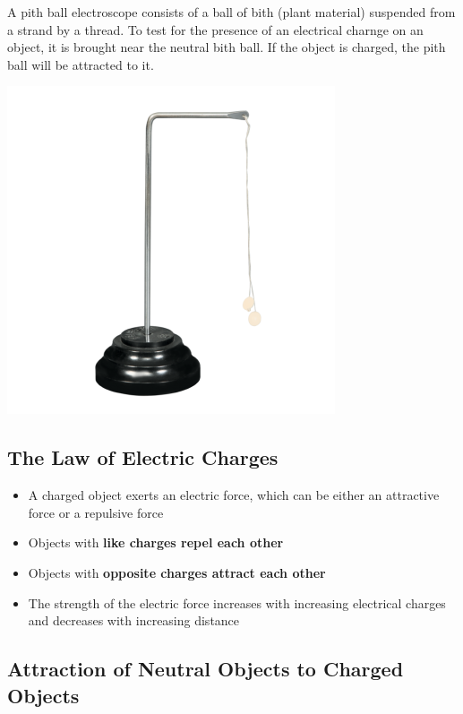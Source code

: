 \documentclass{article}
\begin{document}
    A pith ball electroscope consists of a ball of bith (plant material) suspended from a strand by a thread. To test for the presence of an electrical charnge on an object, it is brought near the neutral bith ball. If the object is charged, the pith ball will be attracted to it.\\
    \begin{center}
    \includegraphics[scale = 0.3]{pithball electroscope}
    \end{center}

    \subsection*{The Law of Electric Charges}

    \begin{itemize}
        \item A charged object exerts an electric force, which can be either an attractive force or a repulsive force
        \item Objects with \textbf{like charges repel each other}
        \item Objects with \textbf{opposite charges attract each other}
        \item The strength of the electric force increases with increasing electrical charges and decreases with increasing distance
    \end{itemize}

    \subsection*{Attraction of Neutral Objects to Charged Objects}
    
\end{document}
